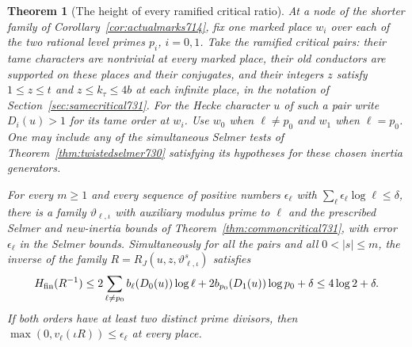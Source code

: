 \documentclass[a4paper,11pt]{article}
\newtheorem{theorem}[proposition]{Theorem}
\theoremstyle{definition}
\theoremstyle{remark}
\numberwithin{equation}{section}
\begin{document}
\begin{theorem}[The height of every ramified critical ratio]\leavevmode
\label{thm:criticalheights734}
At a node of the shorter family of Corollary~\ref{cor:actualmarks714},
fix one marked place \(w_i\) over each of the two rational level
primes \(p_i\), \(i=0,1\). Take the ramified critical pairs: their
tame characters are nontrivial at every marked place, their old
conductors are supported on these places and their conjugates, and
their integers \(z\) satisfy \(1\le z\le t\) and
\(z\le k_\tau\le4b\) at each infinite place, in the notation of
Section~\ref{sec:samecritical731}. For the Hecke character \(u\) of
such a pair write \(D_i(u)>1\) for its tame order at \(w_i\).
Use \(w_0\) when \(\ell\ne p_0\) and \(w_1\) when \(\ell=p_0\).
One may include any of the simultaneous Selmer tests of
Theorem~\ref{thm:twistedselmer730} satisfying its hypotheses for
these chosen inertia generators.

For every \(m\ge1\) and every sequence of positive numbers
\(\epsilon_\ell\) with \(\sum_\ell\epsilon_\ell\log\ell\le\delta\),
there is a family \(\vartheta_{\ell,\iota}\) with auxiliary modulus
prime to \(\ell\) and the prescribed Selmer and new-inertia bounds
of Theorem~\ref{thm:commoncritical731}, with error
\(\epsilon_\ell\) in the Selmer bounds. Simultaneously for all the
pairs and all \(0<|s|\le m\), the inverse of the family
\(R=R_J(u,z,\vartheta_{\ell,\iota}^s)\) satisfies
\[
 H_{\rm fin}(R^{-1})
 \le 2\sum_{\ell\ne p_0} b_\ell(D_0(u))\log\ell
      +2 b_{p_0}(D_1(u))\log p_0+\delta
 \le 4\log 2+\delta .
\]
If both orders have at least two distinct prime divisors, then
\(\max(0,v_\ell(\iota R))\le\epsilon_\ell\) at every place.
\end{theorem}
\end{document}

